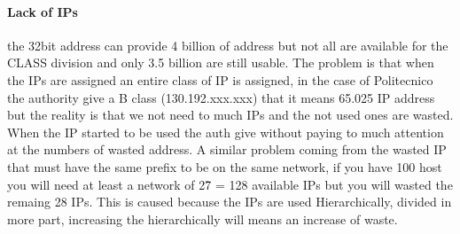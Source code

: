 \documentclass[12pt]{article}
\begin{document}
\paragraph{Lack of IPs} the 32bit address can provide 4 billion of address but not all are available for the CLASS division and only 3.5 billion are still usable. The problem is that when the IPs are assigned an entire class of IP is assigned, in the case of Politecnico the authority give a B class (130.192.xxx.xxx) that it means 65.025 IP address but the reality is that we not need to much IPs and the not used ones are wasted. When the IP started to be used the auth give without paying to much attention at the numbers of wasted address. A similar problem coming from the wasted IP that must have the same prefix to be on the same network, if you have 100 host you will need at least a network of 2\^7 = 128 available IPs but you will wasted the remaing 28 IPs. This is caused because the IPs are used Hierarchically, divided in more part, increasing the hierarchically will means an increase of waste.
\end{document}

